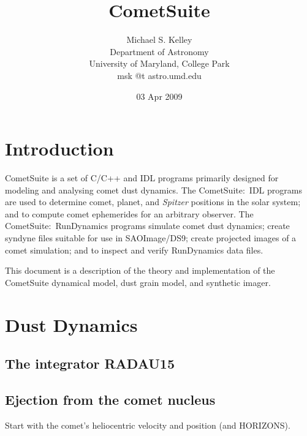 \documentclass[12pt,letterpaper]{article}
\newcommand\spitzer{\textit{Spitzer}}
\newcommand\rundynamics{RunDynamics}
\newcommand\cs{CometSuite}
\begin{document}
\title{CometSuite}
\author{Michael S. Kelley\\
Department of Astronomy\\
University of Maryland, College Park\\
{\small msk @t astro.umd.edu}}

\date{03 Apr 2009}
\maketitle
\tableofcontents

\clearpage

\section{Introduction}
\cs{} is a set of C/C++ and IDL programs primarily designed for
modeling and analysing comet dust dynamics.  The \cs{}:~IDL programs
are used to determine comet, planet, and \spitzer{} positions in the
solar system; and to compute comet ephemerides for an arbitrary
observer.  The \cs{}:~\rundynamics{} programs simulate comet dust
dynamics; create syndyne files suitable for use in SAOImage/DS9;
create projected images of a comet simulation; and to inspect and
verify \rundynamics{} data files.

This document is a description of the theory and implementation of the
\cs{} dynamical model, dust grain model, and synthetic imager.

\section{Dust Dynamics}\label{sec:dynamics}

\lstset{language=csh,basicstyle=\normalsize\ttfamily\singlespacing,
  showstringspaces=false,columns=fullflexible}

\subsection{The integrator RADAU15}


\subsection{Ejection from the comet nucleus}

Start with the comet's heliocentric velocity and position (and
HORIZONS).
\end{document}
